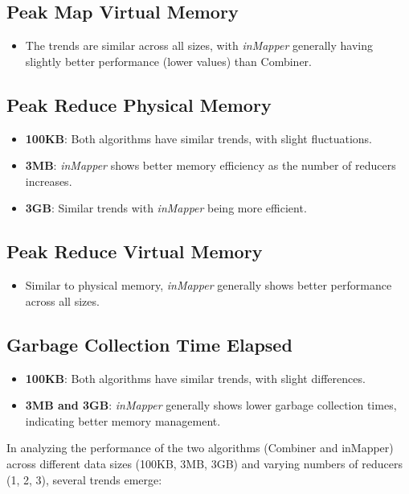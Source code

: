 \subsection{Peak Map Virtual Memory}
\begin{itemize}
    \item The trends are similar across all sizes, with \textit{inMapper} generally having slightly better performance (lower values) than Combiner.
\end{itemize}

\subsection{Peak Reduce Physical Memory}
\begin{itemize}
    \item \textbf{100KB}: Both algorithms have similar trends, with slight fluctuations.
    \item \textbf{3MB}: \textit{inMapper} shows better memory efficiency as the number of reducers increases.
    \item \textbf{3GB}: Similar trends with \textit{inMapper} being more efficient.
\end{itemize}

\subsection{Peak Reduce Virtual Memory}
\begin{itemize}
    \item Similar to physical memory, \textit{inMapper} generally shows better performance across all sizes.
\end{itemize}

\subsection{Garbage Collection Time Elapsed}
\begin{itemize}
    \item \textbf{100KB}: Both algorithms have similar trends, with slight differences.
    \item \textbf{3MB and 3GB}: \textit{inMapper} generally shows lower garbage collection times, indicating better memory management.
\end{itemize}


In analyzing the performance of the two algorithms (Combiner and inMapper) across different data sizes (100KB, 3MB, 3GB) and varying numbers of reducers (1, 2, 3), several trends emerge:


